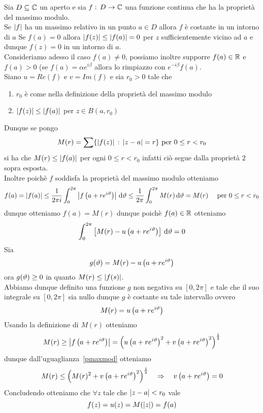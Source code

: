 \begin{thm}\bianco
Sia $D\subseteq \mathbb{C}$ un aperto e sia $f:\, D\to \mathbb{C}$ una funzione continua che ha la propriet\`a del massimo modulo.\\
Se $\left\vert f \right\vert $ ha un massimo relativo in un punto $a\in D$ allora $f$ \`e costante in un intorno di $a$ 
\proof Se $f(a) =0$ allora $\left\vert f(z) \right\vert \leq \left\vert f(a) \right\vert=0$ per $z$ sufficientemente vicino ad $a$ e dunque $f(z)=0$ in un intorno di $a$.\\
Consideriamo adesso il caso $f(a)\neq 0$, possiamo inoltre supporre $f(a) \in \mathbb{R}$ e $f(a) >0$ (se $f(a)=\alpha e^{i\beta}$ allora lo rimpiazzo con $e^{-i\beta} f(a)$.\\
Siano $u=Re(f)$ e $v=Im(f)$ e sia $r_0>0$ tale che 
\begin{enumerate}
\item $r_0$ \`e come nella definizione della propriet\`a del massimo modulo 
\item $\left\vert f(z) \right\vert\leq \left\vert f(a) \right\vert$ per $z\in B(a,r_0)$
\end{enumerate}
Dunque se pongo 
$$ M(r) =\sum\{ \left\vert f(z) \right\vert \, : \, \left\vert z-a \right\vert =r\} \text{ per } 0\leq r <r_0$$
si ha che $M(r) \leq \left\vert f(a) \right\vert$  per ogni $0\leq r< r_0$ infatti ci\`o segue dalla propriet\`a $2$ sopra esposta.\\
Inoltre poich\`e $f$ soddisfa la propriet\`a del massimo modulo otteniamo 
$$ f(a) = \left\vert f(a) \right\vert \leq \frac{1}{2\pi i }\int_0^{2\pi} \left\vert f\left( a+re^{i\vartheta}  \right) \right\vert \, \mathrm{d} \vartheta \leq\frac{1}{2\pi}\int_0^{2\pi} M(r) \, \mathrm{d} \vartheta =M(r) \quad \text{ per } 0\leq r <r_0$$
dunque otteniamo $f(a) = M(r)$ dunque poich\`e $f(a) \in \mathbb{R}$ otteniamo 
$$ \int_0^{2\pi} \left[ M(r) - u\left(  a+re^{i\vartheta} \right) \right]\, \mathrm{d} \vartheta =0$$
Sia 
$$ g(\vartheta) = M(r) - u\left( a+re^{i\vartheta} \right)$$
ora $g(\vartheta)\geq 0$ in quanto $M(r) \leq \left\vert f(s) \right\vert$.\\
Abbiamo dunque definito una funzione $g$ non negativa su $[0,2\pi]$ e tale che il suo integrale su $[0,2\pi]$ sia nullo dunque $g$ \`e costante su tale intervallo ovvero 
\begin{equation}
\label{pmaxmod}
M(r) = u\left( a+re^{i\vartheta} \right)
\end{equation}
Usando la definizione di $M(r)$ otteniamo 
$$M(r) \geq \left\vert f\left( a+re^{i\vartheta} \right) \right\vert = \left(  u\left( a+r e^{i\vartheta} \right)^2 + v\left( a+re^{i\vartheta} \right)^2 \right)^{\frac{1}{2}}$$
dunque dall'uguaglianza~\ref{pmaxmod} otteniamo 
$$ M(r) \leq \left( M(r)^2 + v\left( a+re^{i\vartheta} \right)^2 \right)^{\frac{1}{2}} \quad \Rightarrow \quad v\left( a+re^{i\vartheta} \right) =0 $$
Concludendo otteniamo che $\forall z$ tale che $\left\vert z-a \right\vert<r_0$ vale 
$$ f(z) = u(z) = M(\left\vert z \right\vert) = f(a) $$ 
\end{thm}
